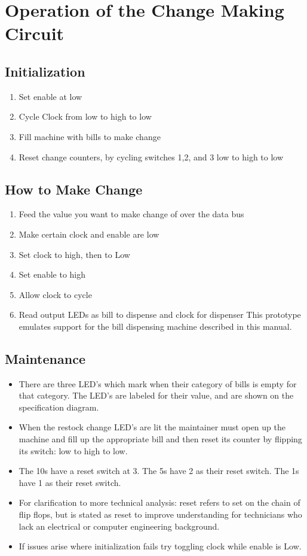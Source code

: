 \section{Operation of the Change Making Circuit}

\subsection{Initialization}
\begin{enumerate}
\item{Set enable at low}
\item{Cycle Clock from low to high to low}
\item{Fill machine with bills to make change}
\item{Reset change counters, by cycling switches 1,2, and 3 low to high to low}
\end{enumerate}

\subsection{How to Make Change}
\begin{enumerate}
\item{Feed the value you want to make change of over the data bus}
\item{Make certain clock and enable are low}
\item{Set clock to high, then to Low}
\item{Set enable to high}
\item{Allow clock to cycle}
\item{Read output LEDs as bill to dispense and clock for dispenser}
This prototype emulates support for the bill dispensing machine 
described in this manual.
\end{enumerate}

\subsection{Maintenance}
\begin{itemize}
\item{There are three LED's which mark when their category of  bills is empty
for that category. The LED's are labeled for their value, and are shown on the
specification diagram.}

\item{When the restock change LED's are lit the maintainer must open up the 
machine and fill up the appropriate bill and then reset its counter by 
flipping its switch: low to high to low.}

\item{The 10s have a reset switch at 3. The 5s have 2 as their reset switch.
The 1s have 1 as their reset switch.} 

\item{For clarification to more technical analysis: reset refers to set on
the chain of flip flops, but is stated as reset to improve understanding for 
technicians who lack an electrical or computer engineering background.}

\item{If issues arise where initialization fails try toggling clock while
enable is Low.}
\end{itemize}
